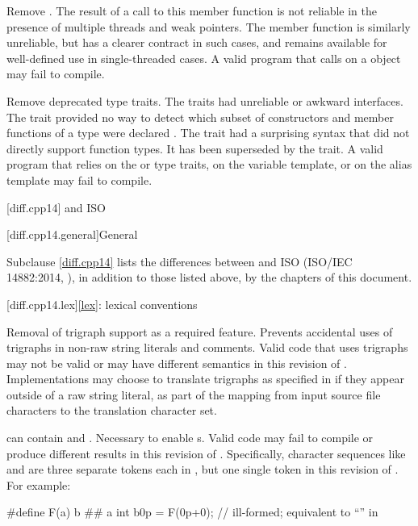 \nodiffref
\change
Remove .
\rationale
The result of a call to this member function is not reliable in the presence of
multiple threads and weak pointers. The member function  is
similarly unreliable, but has a clearer contract in such cases, and remains
available for well-defined use in single-threaded cases.
\effect
A valid \CppXVII{} program that calls  on a 
object may fail to compile.

\change
Remove deprecated type traits.
\rationale
The traits had unreliable or awkward interfaces. The 
trait provided no way to detect which subset of constructors and member
functions of a type were declared . The 
trait had a surprising syntax that did not directly support function types.
It has been superseded by the  trait.
\effect
A valid \CppXVII{} program that relies on the  or
 type traits, on the  variable template,
or on the  alias template may fail to compile.

[diff.cpp14]{\Cpp{} and ISO \CppXIV{}}

[diff.cpp14.general]{General}

\pnum
{}%
Subclause \ref{diff.cpp14} lists the differences between \Cpp{} and
ISO \CppXIV{} (ISO/IEC 14882:2014, ),
in addition to those listed above,
by the chapters of this document.

[diff.cpp14.lex]{\ref{lex}: lexical conventions}

%
\change
Removal of trigraph support as a required feature.
\rationale
Prevents accidental uses of trigraphs in non-raw string literals and comments.
\effect
Valid \CppXIV{} code that uses trigraphs may not be valid or may have different
semantics in this revision of \Cpp{}. Implementations may choose to
translate trigraphs as specified in \CppXIV{} if they appear outside of a raw
string literal, as part of the  mapping from input source file characters to
the translation character set.

\change
{} can contain   and
 .
\rationale
Necessary to enable s.
\effect
Valid \CppXIV{} code may fail to compile or produce different results in
this revision of \Cpp{}. Specifically, character sequences like 
and  are three separate tokens each in \CppXIV{}, but one single token
in this revision of \Cpp{}.
For example:
\begin{codeblock}
#define F(a) b ## a
int b0p = F(0p+0);  // ill-formed; equivalent to ``\!'' in \CppXIV{}
\end{codeblock}

